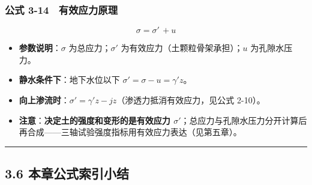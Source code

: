 \documentclass[
]{article}
\providecommand{\tightlist}{%
  \setlength{\itemsep}{0pt}\setlength{\parskip}{0pt}}
\begin{document}
\subsubsection{公式
3-14　有效应力原理}\label{ux516cux5f0f-3-14-ux6709ux6548ux5e94ux529bux539fux7406}

\[\sigma=\sigma'\,+u\]

\begin{itemize}
\tightlist
\item
  \textbf{参数说明}：\(\sigma\) 为总应力；\(\sigma'\)
  为有效应力（土颗粒骨架承担）；\(u\) 为孔隙水压力。
\item
  \textbf{静水条件下}：地下水位以下 \(\sigma'=\sigma-u=\gamma' z\)。
\item
  \textbf{向上渗流时}：\(\sigma'=\gamma' z-jz\)（渗透力抵消有效应力，见公式
  2-10）。
\item
  \textbf{注意}：\textbf{决定土的强度和变形的是有效应力
  \(\sigma'\)}；总应力与孔隙水压力分开计算后再合成------三轴试验强度指标用有效应力表达（见第五章）。
\end{itemize}

\begin{center}\rule{0.5\linewidth}{0.5pt}\end{center}

\subsection{3.6
本章公式索引小结}\label{ux672cux7ae0ux516cux5f0fux7d22ux5f15ux5c0fux7ed3}
\end{document}
